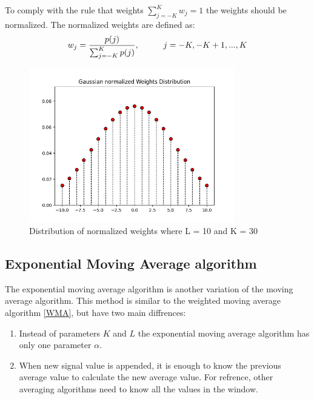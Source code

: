 \documentclass[a4paper,12pt,fleqn]{article}
\begin{document}
        To comply with the rule that weights \begin{math}
            \sum_{j=-K}^K w_j = 1
        \end{math} the weights should be normalized. The normalized weights are defined as:
        \begin{gather}\label{Normalized_weights}
            w_j = \frac{p(j)}{\sum_{j=-K}^K p(j)}, \hspace{1 cm} j = -K, -K+1, ..., K
        \end{gather}
        \begin{figure}[ht]
            \centering
            \includegraphics[width=0.8\textwidth]{images/weights.png} %
            \caption{Distribution of normalized weights where L = 10 and K = 30}
            \label{fig:my_image}
        \end{figure}

        \subsection{Exponential Moving Average algorithm}\label{EMA}
        \hspace{1em} The exponential moving average algorithm is another variation of the moving average algorithm.
        This method is similar to the weighted moving average algorithm \ref{WMA}, 
        but have two main diffrences:
        \begin{enumerate}
            \item Instead of parameters \begin{math}
                K
            \end{math} and \begin{math}
                L
            \end{math} the exponential moving average algorithm has only one parameter \begin{math}
                \alpha
            \end{math}.
            \item When new signal value is appended, it is enough to know 
            the previous average value to calculate the new average value. For refrence, 
            other averaging algorithms need to know all the values in the window.
        \end{enumerate}
\end{document}
